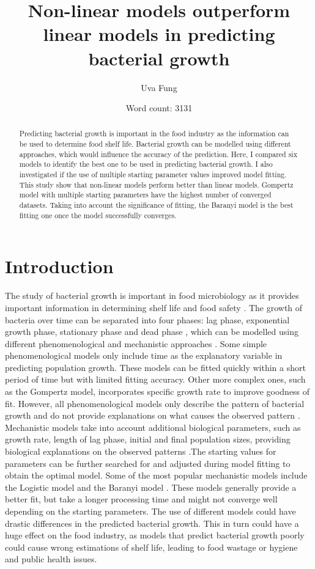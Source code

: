 \documentclass[11pt]{article}
\begin{document}
\title{Non-linear models outperform linear models in predicting bacterial growth}

\author{Uva Fung}

\date{Word count: 3131}


\begin{abstract}
Predicting bacterial growth is important in the food industry as the information can be used to determine food shelf life. Bacterial growth can be modelled using different approaches, which would influence the accuracy of the prediction. Here, I compared six models to identify the best one to be used in predicting bacterial growth. I also investigated if the use of multiple starting parameter values improved model fitting. This study show that non-linear models perform better than linear models. Gompertz model with multiple starting parameters have the highest number of converged datasets. Taking into account the significance of fitting, the Baranyi model is the best fitting one once the model successfully converges. 
\end{abstract} 


\section{Introduction}
The study of bacterial growth is important in food microbiology as it provides important information in determining shelf life and food safety \citep{zwietering_modeling_1990}. The growth of bacteria over time can be separated into four phases: lag phase, exponential growth phase, stationary phase and dead phase \cite{wang_bacterial_2015}, which can be modelled using different phenomenological and mechanistic approaches \cite{johnson_model_2004, peleg_microbial_2011}. Some simple phenomenological models only include time as the explanatory variable in predicting population growth. These models can be fitted quickly within a short period of time but with limited fitting accuracy. Other more complex ones, such as the Gompertz model, incorporates specific growth rate to improve goodness of fit. However, all phenomenological models only describe the pattern of bacterial growth and do not provide explanations on what causes the observed pattern \cite{peleg_microbial_2011}. Mechanistic models take into account additional biological parameters, such as growth rate, length of lag phase, initial and final population sizes, providing biological explanations on the observed patterns \cite{zwietering_modeling_1990}.The starting values for parameters can be further searched for and adjusted during model fitting to obtain the optimal model. Some of the most popular mechanistic models include the Logistic model \cite{zwietering_modeling_1990} and the Baranyi model \cite{baranyi_dynamic_1994}. These models generally provide a better fit, but take a longer processing time and might not converge well depending on the starting parameters. The use of different models could have drastic differences in the predicted bacterial growth. This in turn could have a huge effect on the food industry, as models that predict bacterial growth poorly could cause wrong estimations of shelf life, leading to food wastage or hygiene and public health issues. 
\vspace{\baselineskip}
\end{document}
